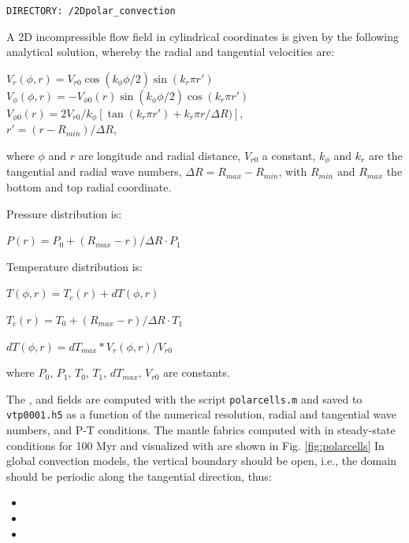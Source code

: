 \texttt{DIRECTORY: /2Dpolar\_convection}

A 2D incompressible flow field in cylindrical coordinates is given by the following analytical solution, whereby the radial and tangential velocities are: \\
\begin{center}
    $V_r(\phi,r) = V_{r0}\cos(k_\phi\phi/2)\sin(k_r\pi r')$ \\
    $V_\phi(\phi,r) = -V_{\phi0}(r)\sin(k_\phi\phi/2)\cos(k_r\pi r')$ \\
    $V_{\phi0}(r) = 2V_{r0}/k_\phi[\tan(k_r\pi r') +  k_r\pi r/\Delta R )]$, \\
    $r' = (r - R_{min})/\Delta R$, \\
\end{center}

where $\phi$ and $r$ are longitude and radial distance, $V_{r0}$ a constant, $k_\phi$ and $k_r$ are the tangential and radial wave numbers, $\Delta R = R_{max} - R_{min}$, with $R_{min}$ and $R_{max}$ the bottom and top radial coordinate. 

Pressure distribution is:
\begin{center}
    $P(r) = P_0 + (R_{max} -r)/\Delta R \cdot P_1$ 
\end{center}
Temperature distribution is:
\begin{center}
    $T(\phi,r) = T_c(r) + dT (\phi,r)$

    $T_c(r) = T_0 + (R_{max} -r)/\Delta R \cdot T_1$

    $dT(\phi,r) = dT_{max}*V_r(\phi,r)/V_{r0}$
\end{center}
where $P_0$, $P_1$, $T_0$, $T_1$, $dT_{max}$, $V_{r0}$ are constants.

The ,  and  fields are computed with the \matlabtitle{} script \texttt{polarcells.m} and saved to \texttt{vtp0001.h5} as a function of the numerical resolution, radial and tangential wave numbers, and P-T conditions. 
The mantle fabrics computed with \drexmtitle{} in steady-state conditions for 100 Myr and visualized with \viztomotitle{} are shown in Fig. \ref{fig:polarcells} 
In global convection models, the vertical boundary should be open, i.e., the domain should be periodic along the tangential direction, thus:\\

    \begin{itemize}
        \item[]  
        \item[]  
        \item[]  
    \end{itemize}


